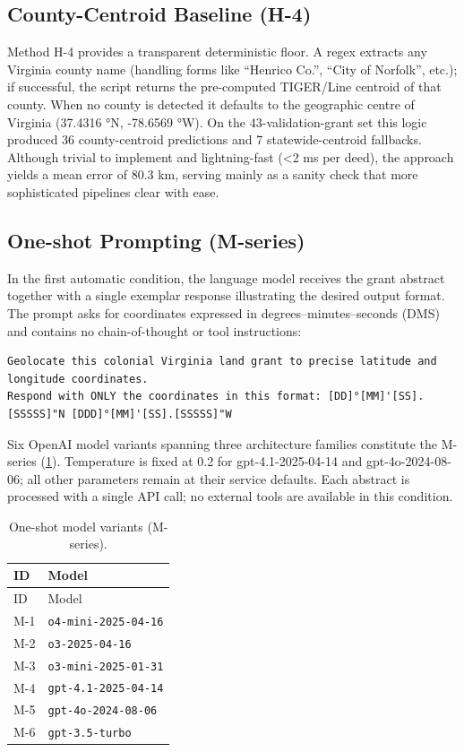 \subsection{County-Centroid Baseline
(H-4)}\label{county-centroid-baseline-h-4}

Method H-4 provides a transparent deterministic floor. A regex extracts
any Virginia county name (handling forms like ``Henrico Co.'', ``City of
Norfolk'', etc.); if successful, the script returns the pre-computed
TIGER/Line centroid of that county. When no county is detected it
defaults to the geographic centre of Virginia (37.4316 °N, -78.6569 °W).
On the 43-validation-grant set this logic produced 36 county-centroid
predictions and 7 statewide-centroid fallbacks. Although trivial to
implement and lightning-fast (\textless2 ms per deed), the approach
yields a mean error of 80.3 km, serving mainly as a sanity check that
more sophisticated pipelines clear with ease.

\subsection{One-shot Prompting
(M-series)}\label{one-shot-prompting-m-series}

In the first automatic condition, the language model receives the grant
abstract together with a single exemplar response illustrating the
desired output format. The prompt asks for coordinates expressed in
degrees--minutes--seconds (DMS) and contains no chain-of-thought or tool
instructions:

\begin{lstlisting}
Geolocate this colonial Virginia land grant to precise latitude and longitude coordinates.
Respond with ONLY the coordinates in this format: [DD]°[MM]'[SS].[SSSSS]"N [DDD]°[MM]'[SS].[SSSSS]"W
\end{lstlisting}

Six OpenAI model variants spanning three architecture families
constitute the M-series (\ref{tbl:mmodels}). Temperature is fixed at 0.2
for gpt-4.1-2025-04-14 and gpt-4o-2024-08-06; all other parameters
remain at their service defaults. Each abstract is processed with a
single API call; no external tools are available in this condition.

\begin{longtable}[]{@{}ll@{}}
\caption{\label{tbl:mmodels}One-shot model variants
(M-series).}\tabularnewline
\toprule\noalign{}
ID & Model \\
\midrule\noalign{}
\endfirsthead
\toprule\noalign{}
ID & Model \\
\midrule\noalign{}
\endhead
\bottomrule\noalign{}
\endlastfoot
M-1 & \passthrough{\lstinline!o4-mini-2025-04-16!} \\
M-2 & \passthrough{\lstinline!o3-2025-04-16!} \\
M-3 & \passthrough{\lstinline!o3-mini-2025-01-31!} \\
M-4 & \passthrough{\lstinline!gpt-4.1-2025-04-14!} \\
M-5 & \passthrough{\lstinline!gpt-4o-2024-08-06!} \\
M-6 & \passthrough{\lstinline!gpt-3.5-turbo!} \\
\end{longtable}

